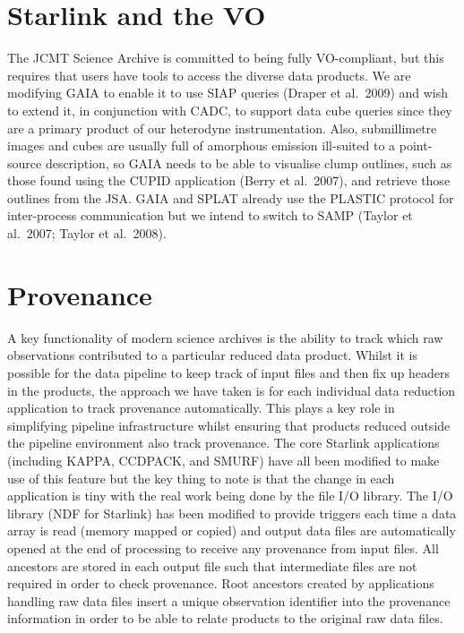 \documentclass[11pt,twoside]{article}  %
\begin{document}
\section{Starlink and the VO}

The JCMT Science Archive is committed to being fully VO-compliant, but this requires that users have tools to access the diverse data products. We are modifying GAIA to enable it to use SIAP queries (Draper et al.\ 2009) and wish to extend it, in conjunction with CADC, to support data cube queries since they are a primary product of our heterodyne instrumentation. Also, submillimetre images and cubes are usually full of amorphous emission ill-suited to a point-source description, so GAIA needs to be able to visualise clump outlines, such as those found using the CUPID application (Berry et al.\ 2007),  and retrieve those outlines from the JSA. GAIA and SPLAT already use the PLASTIC protocol for inter-process communication but we intend to  switch to SAMP (Taylor et al.\ 2007; Taylor et al.\ 2008).

\section{Provenance}

A key functionality of modern science archives is the ability to track which raw observations contributed to a particular reduced data product. Whilst it is possible for the data pipeline to keep track of input files and then fix up headers in the products, the approach we have taken is for each individual data reduction application to track provenance automatically. This plays a key role in simplifying pipeline infrastructure whilst ensuring that products reduced outside the pipeline environment also track provenance. The core Starlink applications (including KAPPA, CCDPACK, and SMURF) have all been modified to make use of this feature but the key thing to note is that the change in each application is tiny with the real work being done by the file I/O library. The I/O library (NDF for Starlink) has been modified to provide triggers each time a data array is read (memory mapped or copied) and output data files are automatically opened at the end of processing to receive any provenance from input files. All ancestors are stored in each output file such that intermediate files are not required in order to check provenance. Root ancestors created by applications handling raw data files insert a unique observation identifier into the provenance information in order to be able to relate products to the original raw data files.
\end{document}
